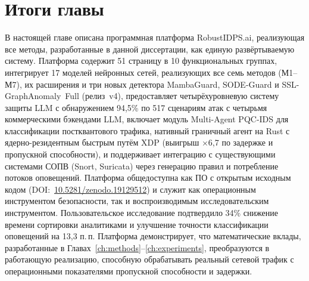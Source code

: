 \section{Итоги главы}
\label{sec:ch5_summary}

В настоящей главе описана программная платформа \textsf{RobustIDPS.ai}, реализующая все методы, разработанные в данной диссертации, как единую развёртываемую систему. Платформа содержит 51 страницу в 10 функциональных группах, интегрирует 17 моделей нейронных сетей, реализующих все семь методов (М1--М7), их расширения и три новых детектора \textsf{MambaGuard}, \textsf{SODE-Guard} и \textsf{SSL-GraphAnomaly~Full} (релиз~v4), предоставляет четырёхуровневую систему защиты LLM с обнаружением 94,5\% по 517 сценариям атак с четырьмя коммерческими бэкендами LLM, включает модуль Multi-Agent PQC-IDS для классификации постквантового трафика, нативный граничный агент на Rust с ядерно-резидентным быстрым путём XDP (выигрыш $\times$6,7 по задержке и пропускной способности), и поддерживает интеграцию с существующими системами СОПВ (Snort, Suricata) через генерацию правил и потребление потоков оповещений. Платформа общедоступна как ПО с открытым исходным кодом (DOI:~\url{10.5281/zenodo.19129512}) и служит как операционным инструментом безопасности, так и воспроизводимым исследовательским инструментом. Пользовательское исследование подтвердило 34\% снижение времени сортировки аналитиками и улучшение точности классификации оповещений на 13,3 п.\,п. Платформа демонстрирует, что математические вклады, разработанные в Главах~\ref{ch:methods}--\ref{ch:experiments}, преобразуются в работающую реализацию, способную обрабатывать реальный сетевой трафик с операционными показателями пропускной способности и задержки.
